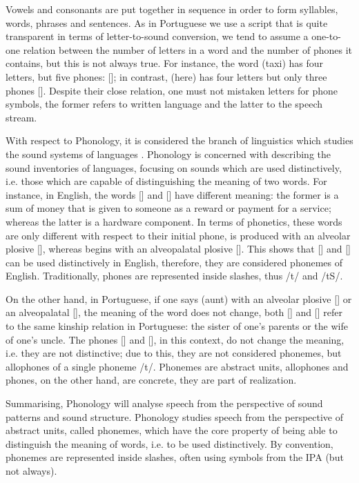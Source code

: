 Vowels and consonants are put together in sequence in order to form syllables, words, phrases and sentences. As in Portuguese we use a script that is quite transparent in terms of letter-to-sound conversion, we tend to assume a one-to-one relation between the number of letters in a word and the number of phones it contains, but this is not always true. For instance, the word  (taxi) has four letters, but five phones: []; in contrast,  (here) has four letters but only three phones []. Despite their close relation, one must not mistaken letters for phone symbols, the former refers to written language and the latter to the speech stream.

With respect to Phonology, it is considered the branch of linguistics which studies the sound systems of languages \cite{Crystal2011}. Phonology is concerned with describing the sound inventories of languages, focusing on sounds which are used distinctively, i.e. those which are capable of distinguishing the meaning of two words. For instance, in English, the words  [] and  [] have different meaning: the former is a sum of money that is given to someone as a reward or payment for a service; whereas the latter is a hardware component. In terms of phonetics, these words are only different with respect to their initial phone,  is produced with an alveolar plosive [], whereas  begins with an alveopalatal plosive []. This shows that [] and [] can be used distinctively in English, therefore, they are considered phonemes of English. Traditionally, phones are represented inside slashes, thus /t/ and /tS/.

On the other hand, in Portuguese, if one says  (aunt) with an alveolar plosive [] or an alveopalatal [], the meaning of the word does not change, both [] and [] refer to the same kinship relation in Portuguese: the sister of one's parents or the wife of one's uncle. The phones [] and [], in this context, do not change the meaning, i.e. they are not distinctive; due to this, they are not considered phonemes, but allophones of a single phoneme /t/. Phonemes are abstract units, allophones and phones, on the other hand, are concrete, they are part of realization.

Summarising, Phonology will analyse speech from the perspective of sound patterns and sound structure. Phonology studies speech from the perspective of abstract units, called phonemes, which have the core property of being able to distinguish the meaning of words, i.e. to be used distinctively. By convention, phonemes are represented inside slashes, often using symbols from the \ac{IPA} (but not always).

